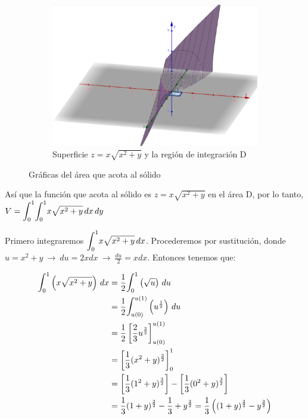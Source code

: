 \documentclass[12pt]{exam}
\begin{document}
\begin{questions}
\begin{enumerate}[a)]
\begin{figure}[H]
\begin{subfigure}[b]{0.4\textwidth}
        \includegraphics[width=\textwidth]{./img/i2e5.png}
        \caption{Superficie $z=x\sqrt{x^2+y}$ y la región de integración D}
        \label{fig:mapa2}
    \end{subfigure}
    \caption{Gráficas del área que acota al sólido}
      \end{figure}
      Así que la función que acota al sólido es  $z=x\sqrt{x^2+y}$ en el área D, por lo tanto,  $V = \mathlarger{\int}_0^1\mathlarger{\int}_0^{1}x \sqrt{x^2+y} \,dx\,dy $
      
      Primero integraremos $\mathlarger{\int}_0^{1}x \sqrt{x^2+y} \,dx$. Procederemos por sustitución, donde $u=x^2+y~\rightarrow ~ du=2xdx ~\rightarrow ~ \frac{du}{2}  = xdx$.
      Entonces tenemos que: 
     
    \begin{align*}
      \mathlarger{\int}_0^1\left(x\sqrt{x^2+y}\right)\,dx 
      &=  \frac{1}{2}\mathlarger{\int}_0^1\left(\sqrt{u}\right)\,du \\
      &=  \frac{1}{2}\mathlarger{\int}_{u(0)}^{u(1)}\left(u^{\frac{1}{2}}\right)\,du \\
      &=  \frac{1}{2} \left[ \frac{2}{3} u^{\frac{3}{2}} \right]_{u(0)}^{u(1)} \\
      &=  \left[ \frac{1}{3} (x^2 + y)^{\frac{3}{2}} \right]_{0}^{1} \\
      &=  \left[ \frac{1}{3} (1^2 + y)^{\frac{3}{2}} \right] -  \left[ \frac{1}{3} (0^2 + y)^{\frac{3}{2}} \right] \\
      &=  \frac{1}{3} (1 + y)^{\frac{3}{2}} -  \frac{1}{3}  + y^{\frac{3}{2}} = \frac{1}{3} \left( (1 + y)^{\frac{3}{2}} -  y^{\frac{3}{2}} \right)      
    \end{align*}


\end{enumerate}
\end{questions}
\end{document}
